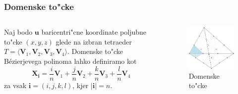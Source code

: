 \documentclass[10pt]{beamer}
\theoremstyle{definition}
\begin{document}
\begin{frame}
\frametitle{Domenske to"cke}

\begin{columns}

\begin{column}{0.5\textwidth}
Naj bodo $\textbf{u}$ baricentri"cne koordinate poljubne to"cke $(x, y, z)$ glede na izbran tetraeder $T = \langle\textbf{V}_{1},\textbf{V}_{2},\textbf{V}_{3}, \textbf{V}_{4}\rangle$.
\vspace{0.3cm}
Domenske to"cke Bézierjevega polinoma lahko definiramo kot
$$
\textbf{X}_{\textbf{i}} = \frac{i}{n}\textbf{V}_{1} + \frac{j}{n}\textbf{V}_{2} + \frac{k}{n}\textbf{V}_{3} + \frac{l}{n}\textbf{V}_{4}
$$
za vsak $\textbf{i} = (i, j, k, l)$, kjer $|\textbf{i}| = n$.
\end{column}

\begin{column}{0.5\textwidth}

\begin{figure}[h!]
\centering
  \includegraphics[scale=0.3]{domen}
  \caption{Domenske to"cke}
  \label{fig:domenske}
\end{figure}

\end{column}

\end{columns}

\end{frame}
\end{document}
